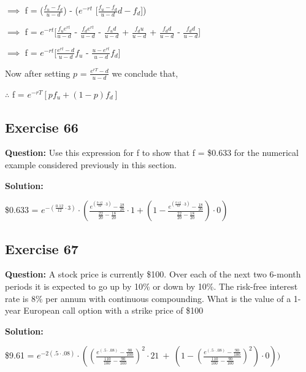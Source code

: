 \documentclass{article}
\begin{document}
\vspace{\baselineskip}

$\implies$ f = ($\frac{f_u - f_d}{u - d}$) - ($e^{-rt}$ [$\frac{f_u - f_d}{u - d}$$d - f_d$])

\vspace{\baselineskip}

$\implies$ f = $e^{-rt}$[$\frac{f_{u}e^{rt}}{u-d}$ - $\frac{f_{d}e^{rt}}{u-d}$ - $\frac{f_{u}d}{u-d}$ + $\frac{f_{d}u}{u-d}$ + $\frac{f_{d}d}{u-d}$ - $\frac{f_{d}d}{u-d}$]

\vspace{\baselineskip}

$\implies$ f = $e^{-rt}$[$\frac{e^{rt} - d}{u-d}$$f_u$ - $\frac{u - e^{rt}}{u-d}$$f_d$]

\vspace{\baselineskip}

Now after setting $p$ = $\frac{e^{rT}-d}{u-d}$ we conclude that,

\vspace{\baselineskip}

$\therefore$ f = $e^{-rT}\left[pf_u+(1-p)f_d\right]$

\subsection*{Exercise 66}
\textbf{Question:} Use this expression for f to show that f = \$0.633 for the numerical example considered previously in this section.

\textbf{Solution:}

\$0.633 = $e^{-\left(\frac{0.12}{12}\cdot3\right)} \cdot \left(\frac{e^{\left(\frac{0.12}{12}\cdot3\right)} - \frac{18}{20}}{\frac{22}{20} - \frac{18}{20}} \cdot 1 + \left(1 - \frac{e^{\left(\frac{0.12}{12}\cdot3\right)} - \frac{18}{20}}{\frac{22}{20} - \frac{18}{20}}\right) \cdot 0\right)$

\subsection*{Exercise 67}
\textbf{Question:} A stock price is currently \$100. Over each of the next two 6-month periods it is expected to go up
by 10\% or down by 10\%. The risk-free interest rate is 8\% per annum with continuous compounding. What is the
value of a 1-year European call option with a strike price of \$100

\textbf{Solution:}

\$9.61 = $e^{-2\left(.5\cdot.08\right)}\cdot\left(\left(\frac{e^{\left(.5\cdot.08\right)}-\frac{90}{100}}{\frac{110}{100\ }-\frac{90}{100}}\right)^{2}\cdot21\ +\ \left(1-\left(\frac{e^{\left(.5\cdot.08\right)}-\frac{90}{100}}{\frac{110}{100\ }-\frac{90}{100}}\right)^{2}\right)\cdot0\right))$
\end{document}
